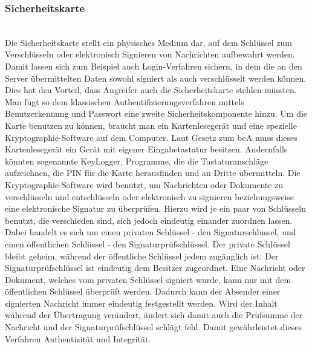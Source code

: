 \subsubsection{Sicherheitskarte}\hspace*{\fill} \\
Die Sicherheitskarte stellt ein physisches Medium dar, auf dem Schlüssel zum Verschlüsseln oder elektronisch Signieren von Nachrichten aufbewahrt werden. Damit lassen sich zum Beispiel auch Login-Verfahren sichern, in dem die an den Server übermittelten Daten sowohl signiert als auch verschlüsselt werden können. Dies hat den Vorteil, dass Angreifer auch die Sicherheitskarte stehlen müssten. Man fügt so dem klassischen Authentifizierungsverfahren mittels Benutzerkennung und Passwort eine zweite Sicherheitskomponente hinzu. Um die Karte benutzen zu können, braucht man ein Kartenlesegerät und eine spezielle Kryptographie-Software auf dem Computer. Laut Gesetz zum beA muss dieses Kartenlesegerät ein Gerät mit eigener Eingabetastatur besitzen. Andernfalls könnten sogenannte KeyLogger, Programme, die die Tastaturanschläge aufzeichnen, die PIN für die Karte herausfinden und an Dritte übermitteln. Die Kryptographie-Software wird benutzt, um Nachrichten oder Dokumente zu verschlüsseln und entschlüsseln oder elektronisch zu signieren beziehungsweise eine elektronische Signatur zu überprüfen. Hierzu wird je ein paar von Schlüsseln benutzt, die verschieden sind, sich jedoch eindeutig einander zuordnen lassen. Dabei handelt es sich um einen privaten Schlüssel - den Signaturschlüssel, und einen öffentlichen Schlüssel - den Signaturprüfschlüssel. Der private Schlüssel bleibt geheim, während der öffentliche Schlüssel jedem zugänglich ist. Der Signaturprüfschlüssel ist eindeutig dem Besitzer zugeordnet. Eine Nachricht oder Dokument, welches vom privaten Schlüssel signiert wurde, kann nur mit dem öffentlichen Schlüssel überprüft werden. Dadurch kann der Absender einer signierten Nachricht immer eindeutig festgestellt werden. Wird der Inhalt während der Übertragung verändert, ändert sich damit auch die Prüfsumme der Nachricht und der Signaturprüfschlüssel schlägt fehl. Damit gewährleistet dieses Verfahren Authentizität und Integrität.

